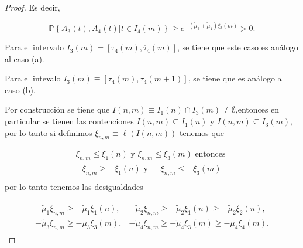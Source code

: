 \documentclass{article}
\newcommand{\prob}{\mathbb{P}}
\begin{document}
\begin{proof}
Es decir, 

\begin{equation}
\prob\left\{A_{3}\left(t\right),A_{4}\left(t\right)|t\in I_{4}\left(m\right)\right\}\geq
e^{-\left(\tilde{\mu}_{3}+\tilde{\mu}_{4}\right)\xi_{3}\left(m\right)}>0.
\end{equation}


Para el intervalo $I_{3}\left(m\right)=\left[\tau_{4}\left(m\right),\overline{\tau}_{4}\left(m\right)\right]$, se tiene que este caso es an\'alogo al caso (a).


Para el intevalo $I_{3}\left(m\right)\equiv\left[\overline{\tau}_{4}\left(m\right),\tau_{4}\left(m+1\right)\right]$, se tiene que es an\'alogo al caso (b).


Por construcci\'on se tiene que $I\left(n,m\right)\equiv I_{1}\left(n\right)\cap I_{3}\left(m\right)\neq\emptyset$,entonces en particular se tienen las contenciones $I\left(n,m\right)\subseteq I_{1}\left(n\right)$ y $I\left(n,m\right)\subseteq I_{3}\left(m\right)$, por lo tanto si definimos $\xi_{n,m}\equiv\ell\left(I\left(n,m\right)\right)$ tenemos que

\begin{eqnarray*}
\xi_{n,m}\leq\xi_{1}\left(n\right)\textrm{ y }\xi_{n,m}\leq\xi_{3}\left(m\right)\textrm{ entonces }\\
-\xi_{n,m}\geq-\xi_{1}\left(n\right)\textrm{ y }-\xi_{n,m}\leq-\xi_{3}\left(m\right)\\
\end{eqnarray*}
por lo tanto tenemos las desigualdades 


\begin{eqnarray*}
\begin{array}{ll}
-\tilde{\mu}_{1}\xi_{n,m}\geq-\tilde{\mu}_{1}\xi_{1}\left(n\right),&
-\tilde{\mu}_{2}\xi_{n,m}\geq-\tilde{\mu}_{2}\xi_{1}\left(n\right)
\geq-\tilde{\mu}_{2}\xi_{2}\left(n\right),\\
-\tilde{\mu}_{3}\xi_{n,m}\geq-\tilde{\mu}_{3}\xi_{3}\left(m\right),&
-\tilde{\mu}_{4}\xi_{n,m}\geq-\tilde{\mu}_{4}\xi_{3}\left(m\right)
\geq-\tilde{\mu}_{4}\xi_{4}\left(m\right).
\end{array}
\end{eqnarray*}


\end{proof}
\end{document}
